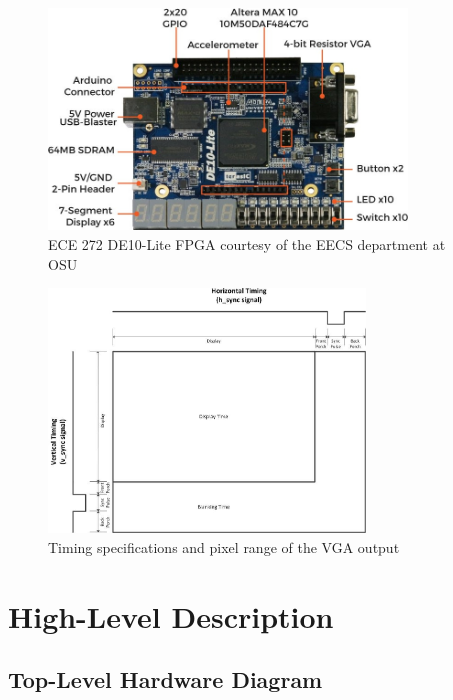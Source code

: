 \documentclass[12pt]{article}
\numberwithin{figure}{subsection}
\begin{document}
\begin{figure}
  \centering
  \includegraphics[width=0.85\textwidth]{de10_lite.jpg}
  \caption{ECE 272 DE10-Lite FPGA courtesy of the EECS department at OSU}
  \label{fig:de10_lite}
\end{figure}

\begin{figure}
  \centering
  \includegraphics[width=0.75\textwidth]{vga_timing_sequence.png}
  \caption{Timing specifications and pixel range of the VGA output}
  \label{fig:vga_timing_sequence}
\end{figure}

\section{High-Level Description}

\subsection{Top-Level Hardware Diagram}
\end{document}
